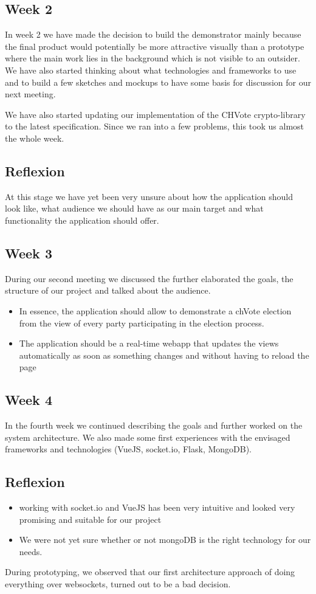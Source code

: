 \subsection{Week 2}
In week 2 we have made the decision to build the demonstrator mainly because the final product would potentially be more attractive visually than a prototype where the main work lies in the background which is not visible to an outsider. We have also started thinking about what technologies and frameworks to use and to build a few sketches and mockups to have some basis for discussion for our next meeting.

We have also started updating our implementation of the CHVote crypto-library to the latest specification. Since we ran into a few problems, this took us almost the whole week.

\subsection{Reflexion}
At this stage we have yet been very unsure about how the application should look like, what audience we should have as our main target and what functionality the application should offer.

\subsection{Week 3}
During our second meeting we discussed the further elaborated the goals, the structure of our project and talked about the audience.
\begin{itemize}
\item In essence, the application should allow to demonstrate a chVote election from the view of every party participating in the election process.
\item The application should be a real-time webapp that updates the views automatically as soon as something changes and without having to reload the page
\end{itemize}

\subsection{Week 4}
In the fourth week we continued describing the goals and further worked on the system architecture. We also made some first experiences with the envisaged frameworks and technologies (VueJS, socket.io, Flask, MongoDB).
\subsection{Reflexion}
\begin{itemize}
\item working with socket.io and VueJS has been very intuitive and looked very promising and suitable for our project
\item We were not yet sure whether or not mongoDB is the right technology for our needs.
\end{itemize}
During prototyping, we observed that our first architecture approach of doing everything over websockets, turned out to be a bad decision. 

